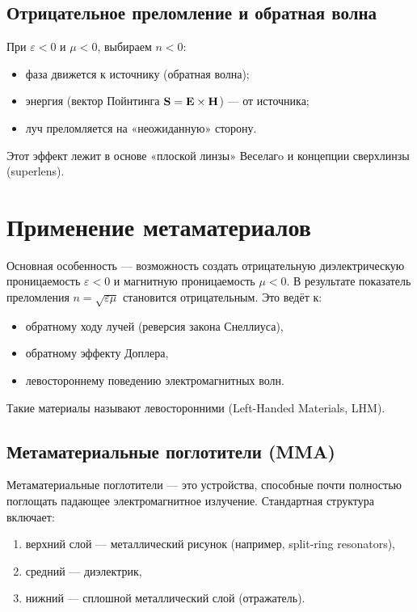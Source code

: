 \documentclass[a4paper,12pt]{article}
\begin{document}
\subsection{Отрицательное преломление и обратная волна}
При $\varepsilon<0$ и $\mu<0$, выбираем $n<0$:
\begin{itemize}
    \item фаза движется к источнику (обратная волна);
    \item энергия (вектор Пойнтинга $\vb{S} = \vb{E} \times \vb{H}$) — от источника;
    \item луч преломляется на «неожиданную» сторону.
\end{itemize}
Этот эффект лежит в основе «плоской линзы» Веселагo и концепции сверхлинзы (superlens).


\section{Применение метаматериалов}

Основная особенность — возможность создать отрицательную диэлектрическую проницаемость $\varepsilon < 0$ и магнитную проницаемость $\mu < 0$. В результате показатель преломления $n = \sqrt{\varepsilon \mu}$ становится отрицательным. Это ведёт к:
\begin{itemize}
    \item обратному ходу лучей (реверсия закона Снеллиуса),
    \item обратному эффекту Доплера,
    \item левостороннему поведению электромагнитных волн.
\end{itemize}

Такие материалы называют левосторонними (Left-Handed Materials, LHM).

\subsection{Метаматериальные поглотители (MMA)}

Метаматериальные поглотители — это устройства, способные почти полностью поглощать падающее электромагнитное излучение. Стандартная структура включает:
\begin{enumerate}
    \item верхний слой — металлический рисунок (например, split-ring resonators),
    \item средний — диэлектрик,
    \item нижний — сплошной металлический слой (отражатель).
\end{enumerate}
\end{document}
